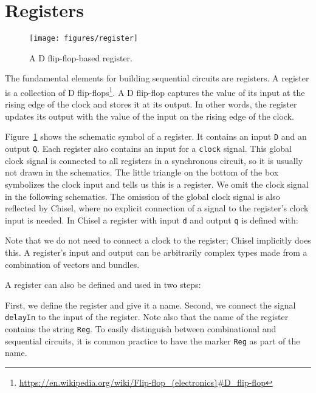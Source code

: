 \documentclass[%
    10pt,
    headinclude, footexclude,
    openright, %
    notitlepage,
    cleardoubleempty,
    headsepline,
    pointlessnumbers,
    bibtotoc, idxtotoc,
    ]{scrbook}
\newcommand{\scale}{0.7}
\newcommand{\code}[1]{{\lstinline[basicstyle=\small\ttfamily]{#1}}}
\newcommand{\myref}[2]{\href{#1}{#2}}
\renewcommand{\myref}[2]{{#2}{\footnote{\url{#1}}}}
\begin{document}
\section{Registers}


\begin{figure}
  \centering
  \texttt{[image: figures/register]}
  \caption{A D flip-flop-based register.}
  \label{fig:register}
\end{figure}

The fundamental elements for building sequential circuits are registers. A register is a collection
of \myref{https://en.wikipedia.org/wiki/Flip-flop_(electronics)\#D_flip-flop}{D flip-flops}.
A D flip-flop captures the value of its input at the rising edge of the clock and stores
it at its output. In other words, the register updates its output with the value of the input on the rising edge of the clock.

Figure~\ref{fig:register} shows the schematic symbol of a register. It contains an input
\code{D} and an output \code{Q}. Each register also contains an input for a \code{clock} signal.
This global clock signal is connected to all registers in a synchronous circuit, so it is usually
not drawn in the schematics. The little triangle on the bottom of the box symbolizes the
clock input and tells us this is a register. We omit the clock signal in the following
schematics.
The omission of the global clock signal is also reflected by Chisel, where no explicit
connection of a signal to the register's clock input is needed.
In Chisel a register with input \code{d} and output \code{q} is defined with:


\noindent Note that we do not need to connect a clock to the register; Chisel implicitly does this.
A register's input and output can be arbitrarily complex types
made from a combination of vectors and bundles.

A register can also be defined and used in two steps:


First, we define the register and give it a name. Second, we connect the signal
\code{delayIn} to the input of the register. Note also that the name of the register
contains the string \code{Reg}. To easily distinguish between combinational
and sequential circuits, it is common practice to have the marker
\code{Reg} as part of the name.
\end{document}
